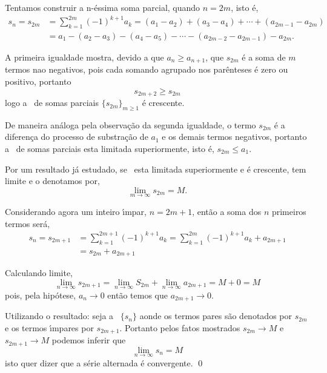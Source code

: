 \prova Tentamos construir a n-\'{e}ssima soma parcial, quando $n=2m$,
isto \'{e},
\begin{align*}
s_n=s_{2m}&=\sum_{k=1}^{2m}(-1)^{k+1}a_k=(a_1-a_2)+(a_3-a_4)+\cdots +(a_{2m-1}-a_{2m})\\[2ex]
&=a_1-(a_2-a_3)-(a_4-a_5)-\cdots-(a_{2m-2}-a_{2m-1})-a_{2m}.
\end{align*}

A primeira igualdade mostra, devido a que $a_n\geq a_{n+1}$, que
$s_{2m}$ \'{e} a soma de $m$ termos nao negativos, pois cada somando
agrupado nos par\^{e}nteses \'{e} zero ou positivo, portanto
\begin{equation*}
    s_{2m+2}\geq s_{2m}
\end{equation*}
logo a \seq\ de somas parciais $\{s_{2m}\}_{m\geq 1}$ \'{e} crescente.

De maneira an\'{a}loga pela observa\c{c}\~{a}o da segunda igualdade, o termo
$s_{2m}$ \'{e} a diferen\c{c}a do processo de substra\c{c}\~{a}o de $a_1$ e os
demais termos negativos, portanto a \seq\ de somas parciais esta
limitada superiormente, isto \'{e}, $s_{2m}\leq a_1$.

Por um resultado j\'{a} estudado, se \seq\ esta limitada superiormente e
\'{e} crescente, tem limite e o denotamos por,
\begin{equation*}
\lim_{m\to\infty}s_{2m}=M.
\end{equation*}

Considerando agora um inteiro \'{\i}mpar, $n=2m+1$, ent\~{a}o a soma dos $n$
primeiros termos ser\'{a},
\begin{align*}
s_n=s_{2m+1}&=\sum_{k=1}^{2m+1}(-1)^{k+1}a_k=\sum_{k=1}^{2m}(-1)^{k+1}a_k+a_{2m+1}\\[2ex]
&=s_{2m}+a_{2m+1}
\end{align*}

Calculando limite,
\begin{equation*}
    \lim_{n\to\infty}s_{2m+1}= \lim_{n\to\infty}S_{2m}+
    \lim_{n\to\infty}a_{2m+1}=M+0=M
\end{equation*}
pois, pela hip\'{o}tese, $a_n\to 0$ ent\~{a}o temos que $a_{2m+1}\to 0$.

Utilizando o resultado: seja a \seq\ $\{s_n\}$ aonde os termos pares
s\~{a}o denotados por $s_{2m}$ e os termos \'{\i}mpares por $s_{2m+1}$.
Portanto pelos fatos mostrados $s_{2m}\to M$ e $s_{2m+1}\to M$
podemos inferir que
\begin{equation*}
    \lim_{n\to\infty}s_{n}=M
\end{equation*}
isto quer dizer que a s\'{e}rie alternada \'{e} convergente. \qed

